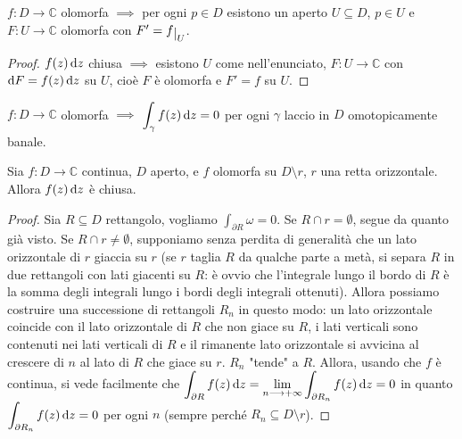 \begin{cor}
  $f:D \longrightarrow \mathbb{C}$ olomorfa $\implies$ per ogni $p \in D$ esistono un aperto $U \subseteq D$, $p \in U$ e $F:U \longrightarrow \mathbb{C}$ olomorfa con $F'=f\restrict{U}$.
\end{cor}

\begin{proof}
  $f(z)\mathop{}\!\mathrm{d} z$ chiusa $\implies$ esistono $U$ come nell'enunciato, $F:U \longrightarrow \mathbb{C}$ con  $\mathop{}\!\mathrm{d} F=f(z)\mathop{}\!\mathrm{d} z$ su $U$, cioè $F$ è olomorfa e $F'=f$ su $U$.
\end{proof}

\begin{cor}
  $f:D \longrightarrow \mathbb{C}$ olomorfa $\implies$ $\displaystyle \int_{\gamma} f(z)\mathop{}\!\mathrm{d} z=0$ per ogni $\gamma$ laccio in $D$ omotopicamente banale.
\end{cor}

\begin{prop} \label{retta_orizzontale}
  Sia $f:D \longrightarrow \mathbb{C}$ continua, $D$ aperto, e $f$ olomorfa su $D \setminus r$, $r$ una retta orizzontale. Allora $f(z)\mathop{}\!\mathrm{d} z$ è chiusa.
\end{prop}

\begin{proof}
  Sia $R \subseteq D$ rettangolo, vogliamo $\displaystyle \int_{\partial R} \omega=0$. Se $R \cap r=\emptyset$, segue da quanto già visto. Se $R \cap r\not=\emptyset$, supponiamo senza perdita di generalità che un lato orizzontale di $r$ giaccia su $r$ (se $r$ taglia $R$ da qualche parte a metà, si separa $R$ in due rettangoli con lati giacenti su $R$: è ovvio che l'integrale lungo il bordo di $R$ è la somma degli integrali lungo i bordi degli integrali ottenuti). Allora possiamo costruire una successione di rettangoli $R_n$ in questo modo: un lato orizzontale coincide con il lato orizzontale di $R$ che non giace su $R$, i lati verticali sono contenuti nei lati verticali di $R$ e il rimanente lato orizzontale si avvicina al crescere di $n$ al lato di $R$ che giace su $r$.
  $R_n$ "tende" a $R$. Allora, usando che $f$ è continua, si vede facilmente che $\displaystyle \int_{\partial R} f(z)\mathop{}\!\mathrm{d} z=\lim_{n \longrightarrow +\infty} \int_{\partial R_n} f(z)\mathop{}\!\mathrm{d} z=0$ in quanto $\displaystyle \int_{\partial R_n} f(z)\mathop{}\!\mathrm{d} z=0$ per ogni $n$ (sempre perché $R_n \subseteq D \setminus r$).
\end{proof}

